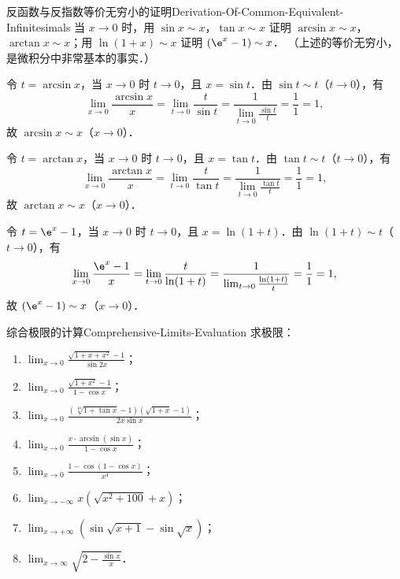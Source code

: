 \begin{problem}{反函数与反指数等价无穷小的证明}{Derivation-Of-Common-Equivalent-Infinitesimals}
    当 $x \to 0$ 时，用 $\sin x \sim x$，$\tan x \sim x$ 证明 $\arcsin x \sim x$，$\arctan x \sim x$；用 $\ln(1+x) \sim x$ 证明 $(\e^x - 1) \sim x$．
    （上述的等价无穷小，是微积分中非常基本的事实．）
\end{problem}

\begin{myproof}
    令 $t = \arcsin x$，当 $x \to 0$ 时 $t \to 0$，且 $x = \sin t$．由 $\sin t \sim t$（$t \to 0$），有
    \begin{equation}
        \lim_{x\to 0} \frac{\arcsin x}{x} = \lim_{t\to 0} \frac{t}{\sin t} = \frac{1}{\lim_{t\to 0} \frac{\sin t}{t}} = \frac{1}{1} = 1,
    \end{equation}
    故 $\arcsin x \sim x$（$x \to 0$）．

    令 $t = \arctan x$，当 $x \to 0$ 时 $t \to 0$，且 $x = \tan t$．由 $\tan t \sim t$（$t \to 0$），有
    \begin{equation}
        \lim_{x\to 0} \frac{\arctan x}{x} = \lim_{t\to 0} \frac{t}{\tan t} = \frac{1}{\lim_{t\to 0} \frac{\tan t}{t}} = \frac{1}{1} = 1,
    \end{equation}
    故 $\arctan x \sim x$（$x \to 0$）．

    令 $t = \e^x - 1$，当 $x \to 0$ 时 $t \to 0$，且 $x = \ln(1+t)$．由 $\ln(1+t) \sim t$（$t \to 0$），有
    \begin{equation}
        \lim_{x\to 0} \frac{\e^x - 1}{x} = \lim_{t\to 0} \frac{t}{\ln(1+t)} = \frac{1}{\lim_{t\to 0} \frac{\ln(1+t)}{t}} = \frac{1}{1} = 1,
    \end{equation}
    故 $(\e^x - 1) \sim x$（$x \to 0$）．
\end{myproof}

\begin{problem}{综合极限的计算}{Comprehensive-Limits-Evaluation}
    求极限：
    \begin{enumerate}
        \item $\lim_{x\to 0} \frac{\sqrt{1+x+x^2}-1}{\sin 2x}$；
        \item $\lim_{x\to 0} \frac{\sqrt{1+x^2}-1}{1-\cos x}$；
        \item $\lim_{x\to 0} \frac{(\sqrt[10]{1+\tan x}-1)(\sqrt{1+x}-1)}{2x\sin x}$；
        \item $\lim_{x\to 0} \frac{x\cdot \arcsin(\sin x)}{1-\cos x}$；
        \item $\lim_{x\to 0} \frac{1-\cos(1-\cos x)}{x^4}$；
        \item $\lim_{x\to -\infty} x(\sqrt{x^2+100}+x)$；
        \item $\lim_{x\to +\infty} (\sin\sqrt{x+1}-\sin\sqrt{x})$；
        \item $\lim_{x\to\infty} \sqrt{2-\frac{\sin x}{x}}$．
    \end{enumerate}
\end{problem}

